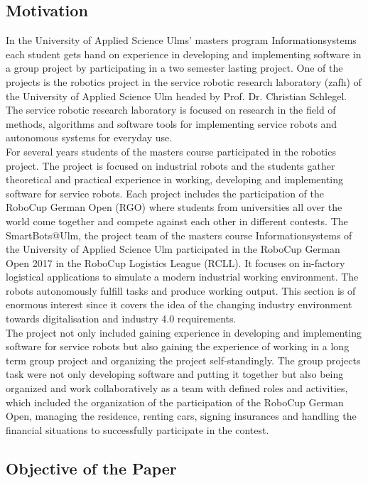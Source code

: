 \subsection{Motivation}

In the University of Applied Science Ulms' masters program Informationsystems each student gets hand on experience in developing and implementing software in a group project by participating in a two semester lasting project. One of the projects is the robotics project in the service robotic research laboratory (zafh) of the University of Applied Science Ulm headed by Prof. Dr. Christian Schlegel. The service robotic research laboratory is focused on research in the field of methods, algorithms and software tools for implementing service robots and autonomous systems for everyday use. \\
For several years students of the masters course participated in the robotics project. The project is focused on industrial robots and the students gather theoretical and practical experience in working, developing and implementing software for service robots. Each project includes the participation of the RoboCup German Open (RGO) where students from universities all over the world come together and compete against each other in different contests. The SmartBots@Ulm, the project team of the masters course Informationsystems of the University of Applied Science Ulm participated in the RoboCup German Open 2017 in the RoboCup Logistics League (RCLL). It focuses on in-factory logistical applications to simulate a modern industrial working environment. The robots autonomously fulfill tasks and produce working output. This section is of enormous interest since it covers the idea of the changing industry environment towards digitalisation and industry 4.0 requirements. \\
The project not only included gaining experience in developing and implementing software for service robots but also gaining the experience of working in a long term group project and organizing the project self-standingly. The group projects task were not only developing software and putting it together but also being organized and work collaboratively as a team with defined roles and activities, which included the organization of the participation of the RoboCup German Open, managing the residence, renting cars, signing insurances and handling the financial situations to successfully participate in the contest. 

\subsection{Objective of the Paper}

